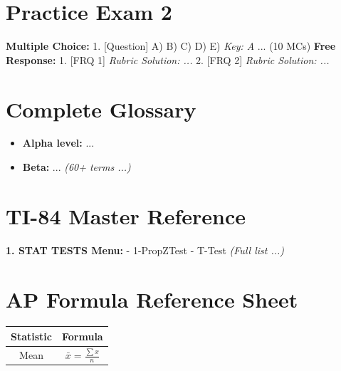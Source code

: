 \chapter{Practice Exam 2}
\textbf{Multiple Choice:}
1. [Question] A) B) C) D) E) \textit{Key: A}
... (10 MCs)
\textbf{Free Response:}
1. [FRQ 1] \textit{Rubric Solution: ...}
2. [FRQ 2] \textit{Rubric Solution: ...}

\chapter{Complete Glossary}
\begin{itemize}
    \item \textbf{Alpha level:} ...
    \item \textbf{Beta:} ...
    \textit{(60+ terms ...)}
\end{itemize}

\chapter{TI-84 Master Reference}
\textbf{1. STAT TESTS Menu:}
- 1-PropZTest
- T-Test
\textit{(Full list ...)}

\chapter{AP Formula Reference Sheet}
\begin{longtable}{|c|c|}
\hline
\textbf{Statistic} & \textbf{Formula} \\
\hline
Mean & $\bar{x} = \frac{\sum x}{n}$ \\
\hline
\end{longtable}

